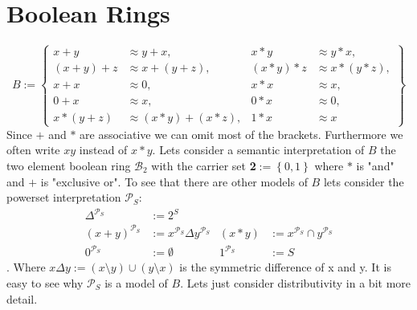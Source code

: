 \section{Boolean Rings}
\[B:=\left\lbrace 
\begin{aligned}
x+y&\approx y+x,& x*y&\approx y*x,\\
(x+y)+z&\approx x+(y+z),& (x*y)*z&\approx x*(y*z),\\
x+x&\approx 0,& x*x&\approx x,\\
0+x&\approx x,& 0*x&\approx 0,\\
x*(y+z)&\approx (x*y)+(x*z),& 1*x&\approx x
\end{aligned}
\right\rbrace \]
Since $+$ and $*$ are associative we can omit most of the brackets. Furthermore we often write $xy$ instead of $x*y$.
Lets consider a semantic interpretation of $B$ the two element boolean ring $\mathcal{B}_2$ with the carrier set \textbf{2}$:=\left\lbrace 0,1\right\rbrace$ where $*$ is "and" and $+$ is "exclusive or". 
To see that there are other models of $B$ lets consider the powerset interpretation $\mathcal{P}_S$:
\begin{align*}
\Delta^{\mathcal{P}_S}&:=2^S\\
(x+y)^{\mathcal{P}_S}&:=x^{\mathcal{P}_S}\Delta y^{\mathcal{P}_S}& (x*y)&:=x^{\mathcal{P}_S}\cap y^{\mathcal{P}_S}\\
0^{\mathcal{P}_S}&:=\emptyset& 1^{\mathcal{P}_S}&:=S
\end{align*}.
Where $x\Delta y:=(x\setminus y)\cup(y\setminus x)$ is the symmetric difference of x and y. It is easy to see why $\mathcal{P}_S$ is a model of $B$. Lets just consider distributivity in a bit more detail.
\def\f{1.3}
\def\CircleX{(\f*0.5,\f*0.866) circle (\f*0.8)}
\def\CircleY{(\f*0,0) circle (\f*0.8)}
\def\CircleZ{(\f*1,0) circle (\f*0.8)}
